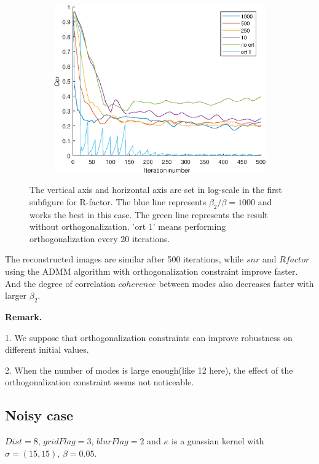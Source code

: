 \documentclass{article}
\numberwithin{equation}{section}
\begin{document}
\begin{figure}
\begin{subfigure}{.3\textwidth}
   \label{fig:ort_snr}
 \end{subfigure}
 \begin{subfigure}{.3\textwidth}
    \centering
    \includegraphics[width=1\linewidth]{../figures/ort_cor.eps}  
    \label{fig:ort_cor}
  \end{subfigure}
 \caption{The vertical axis and horizontal axis are set in log-scale in the first subfigure for R-factor. The blue line represents $\beta_2/\beta=1000$ and works the best in this case. The green line represents the result without orthogonalization. 'ort 1' means performing orthogonalization every 20 iterations. }
 \label{fig:ort}
 \end{figure}

 The reconstructed images are similar after 500 iterations, while $snr$ and $R factor$ using the ADMM algorithm with orthogonalization constraint improve faster. And the degree of correlation  $coherence$ between modes also decreases faster with larger $\beta_2$. 



\noindent\textbf{Remark.}

1. We suppose that orthogonalization constraints can improve robustness on different initial values. 

2. When the number of modes is large enough(like 12 here), the effect of the orthogonalization constraint seems not noticeable.

\subsection{Noisy case}
 $Dist=8$, $gridFlag=3$, $blurFlag=2$ and $\kappa$ is a guassian kernel with $\sigma = (15,15)$, $\beta=0.05$.
 
\end{document}
